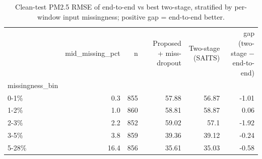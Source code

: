 \begin{table}
\caption{Clean-test PM2.5 RMSE of end-to-end vs best two-stage, stratified by per-window input missingness; positive gap = end-to-end better.}
\label{tab:stratified}
\begin{tabular}{lrrrrr}
\toprule
 & mid\_missing\_pct & n & Proposed + miss-dropout & Two-stage (SAITS) & gap (two-stage − end-to-end) \\
missingness_bin &  &  &  &  &  \\
\midrule
0-1\% & 0.3 & 855 & 57.88 & 56.87 & -1.01 \\
1-2\% & 1.0 & 860 & 58.81 & 58.87 & 0.06 \\
2-3\% & 2.2 & 852 & 59.02 & 57.1 & -1.92 \\
3-5\% & 3.8 & 859 & 39.36 & 39.12 & -0.24 \\
5-28\% & 16.4 & 856 & 35.61 & 35.03 & -0.58 \\
\bottomrule
\end{tabular}
\end{table}
